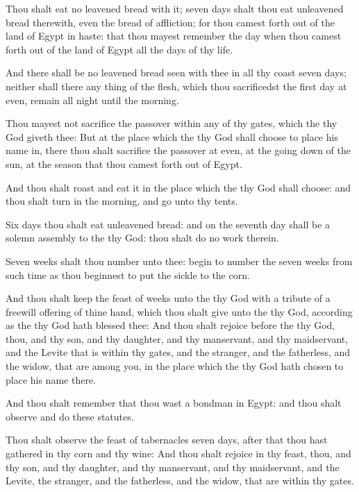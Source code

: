 \Verse Thou shalt eat no leavened bread with it; seven days shalt thou eat unleavened bread therewith, even the bread of affliction; for thou camest forth out of the land of Egypt in haste: that thou mayest remember the day when thou camest forth out of the land of Egypt all the days of thy life.

\Verse And there shall be no leavened bread seen with thee in all thy coast seven days; neither shall there any thing of the flesh, which thou sacrificedst the first day at even, remain all night until the morning.

\Verse Thou mayest not sacrifice the passover within any of thy gates, which the \LORD thy God giveth thee: \Verse But at the place which the \LORD thy God shall choose to place his name in, there thou shalt sacrifice the passover at even, at the going down of the sun, at the season that thou camest forth out of Egypt.

\Verse And thou shalt roast and eat it in the place which the \LORD thy God shall choose: and thou shalt turn in the morning, and go unto thy tents.

\Verse Six days thou shalt eat unleavened bread: and on the seventh day shall be a solemn assembly to the \LORD thy God: thou shalt do no work therein.

\Verse Seven weeks shalt thou number unto thee: begin to number the seven weeks from such time as thou beginnest to put the sickle to the corn.

\Verse And thou shalt keep the feast of weeks unto the \LORD thy God with a tribute of a freewill offering of thine hand, which thou shalt give unto the \LORD thy God, according as the \LORD thy God hath blessed thee: \Verse And thou shalt rejoice before the \LORD thy God, thou, and thy son, and thy daughter, and thy manservant, and thy maidservant, and the Levite that is within thy gates, and the stranger, and the fatherless, and the widow, that are among you, in the place which the \LORD thy God hath chosen to place his name there.

\Verse And thou shalt remember that thou wast a bondman in Egypt: and thou shalt observe and do these statutes.

\Verse Thou shalt observe the feast of tabernacles seven days, after that thou hast gathered in thy corn and thy wine: \Verse And thou shalt rejoice in thy feast, thou, and thy son, and thy daughter, and thy manservant, and thy maidservant, and the Levite, the stranger, and the fatherless, and the widow, that are within thy gates.

